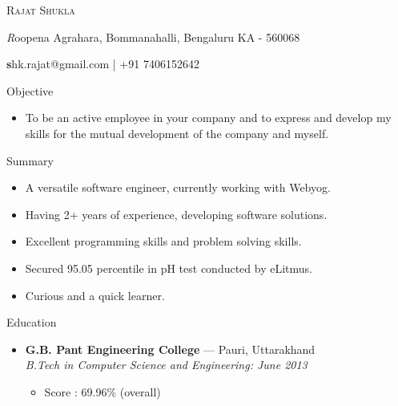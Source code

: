 \documentclass[a4paper,11pt,oneside]{article}
\makeatletter
\newcommand{\name}{Rajat Shukla}
\newcommand{\addr}{Roopena Agrahara, Bommanahalli, Bengaluru KA - 560068}
\newcommand{\contact}{shk.rajat@gmail.com | +91 7406152642}
\newcommand{\bigname}[1]{
  \begin{center}\fontfamily{phv}\selectfont\Huge\scshape#1\end{center}
}
\newcommand{\bignamenew}[1]{
  \begin{center}\selectfont\Huge\scshape#1\end{center}
}
\newcommand{\addrinfo}[1]{
  \begin{center}\selectfont\small\textit#1\end{center}
}
\newcommand{\contactinfo}[1]{
  \begin{center}\selectfont\small\textbf#1\end{center}
}
\newcommand{\resdescpara}[1]{
  \vspace{-5pt}
\item
  #1
}
\newenvironment{ressection}[1]{
  \vspace{4pt}
         {\fontfamily{phv}\selectfont\Large#1}
         \begin{itemize}
           \vspace{3pt}
}{
         \end{itemize}
}
\newcommand{\resitem}[1]{
  \vspace{-4pt}
\item \begin{flushleft} #1 \end{flushleft}
}
\newcommand{\ressubitem}[1]{
  \vspace{-1pt}
\item \begin{flushleft} #1 \end{flushleft}
}
\newcommand{\resbigitem}[3]{
  \vspace{-5pt}
\item
  \textbf{#1} --- #2 \\
  \textit{#3}
}
\newenvironment{ressubsec}[3]{
  \resbigitem{#1}{#2}{#3}
  \vspace{-2pt}
  \begin{itemize}
}{
  \end{itemize}
}
\makeatother
\begin{document}

\bigname{\name}

\vspace{2 pt}
\addrinfo{\addr}

\contactinfo{\contact}
\vspace{8 pt}


\begin{ressection}{Objective}
  \resdescpara{To be an active employee in your company and to express and develop my skills for the mutual development of the company and myself.}
\end{ressection}


\begin{ressection}{Summary}
  \resitem{A versatile software engineer, currently working with Webyog.}
  \resitem{Having 2+ years of experience, developing software solutions.}
  \resitem{Excellent programming skills and problem solving skills.}
  \resitem{Secured 95.05 percentile in pH test conducted by eLitmus.}
  \resitem{Curious and a quick learner.}
\end{ressection}



\begin{ressection}{Education}
  \begin{ressubsec}{G.B. Pant Engineering College}{Pauri, Uttarakhand}{B.Tech in Computer Science and Engineering: June 2013}
    \ressubitem{Score : 69.96\% (overall)}
  \end{ressubsec}
\end{ressection}

\end{document}
